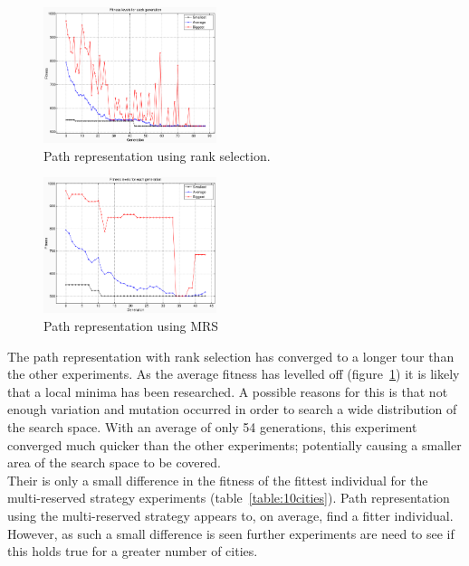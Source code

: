 \documentclass[10pt,a4paper,openbib]{article}
\begin{document}
\begin{multicols}{2}
\begin{figure}[H]
\begin{center}
        \includegraphics[width=0.45\textwidth]{images/result1/GraphPathfalse4.png}
        \caption{Path representation using rank selection.}
        \label{fig:cities10GraphPathfalse}
\end{center}
\end{figure}

\begin{figure}[H]
\begin{center}
        \includegraphics[width=0.45\textwidth]{images/result1/GraphPathtrue7.png}
        \caption{Path representation using MRS}
        \label{fig:cities10GraphPathtrue}
\end{center}
\end{figure} 

\noindent The path representation with rank selection has converged to a longer tour than the other experiments. As the average fitness has levelled off (figure~\ref{fig:cities10GraphPathfalse}) it is likely that a local minima has been researched. A possible reasons for this is that not enough variation and mutation occurred in order to search a wide distribution of the search space. With an average of only 54 generations, this experiment converged much quicker than the other experiments; potentially causing a smaller area of the search space to be covered. \\ 

\noindent Their is only a small difference in the fitness of the fittest individual for the multi-reserved strategy experiments (table~\ref{table:10cities}). Path representation using the multi-reserved strategy appears to, on average, find a fitter individual. However, as such a small difference is seen further experiments are need to see if this holds true for a greater number of cities. \\



\end{multicols}
\end{document}
